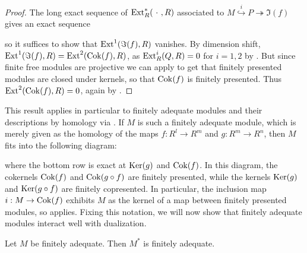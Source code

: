 \begin{proof}
  The long exact sequence of $\mathrm{Ext}^\ast_R(\ \cdot\ , R)$ associated to $M \overset{i}{\hookrightarrow} P \twoheadrightarrow \Im(f)$ gives an exact sequence
  \begin{center}
  \end{center}
  so it suffices to show that $\mathrm{Ext}^1(\Im (f), R)$ vanishes.
  By dimension shift, $\mathrm{Ext}^1(\Im (f), R) = \mathrm{Ext}^2(\operatorname{Cok} (f), R)$,
  as $\mathrm{Ext}^i_R(Q,R) = 0$ for $i = 1, 2$ by .
  But since finite free modules are projective we can apply  to get that finitely presented modules are closed under kernels, so that $\operatorname{Cok}(f)$ is finitely presented.
  Thus $\mathrm{Ext}^2(\operatorname{Cok} (f), R) = 0$, again by .
\end{proof}

This result applies in particular to finitely adequate modules and their descriptions by homology via .
If $M$ is such a finitely adequate module, which is merely given as the homology of the maps $f : R^l \to R^m$ and $g : R^m \to R^n$, then $M$ fits into the following diagram:
\begin{center}
\end{center}
where the bottom row is exact at $\operatorname{Ker} (g)$ and $\operatorname{Cok} (f)$.
In this diagram, the cokernels $\operatorname{Cok}(f)$ and $\operatorname{Cok}(g \circ f)$ are finitely presented, while the kernels $\operatorname{Ker}(g)$ and $\operatorname{Ker}(g \circ f)$ are finitely copresented.
In particular, the inclusion map $i : M \to \operatorname{Cok} (f)$ exhibits $M$ as the kernel of a map between finitely presented modules, so  applies.
Fixing this notation, we will now show that finitely adequate modules interact well with dualization.

\begin{proposition}\label{prp:dual-fin-ad}
  Let $M$ be finitely adequate. Then $M^\ast$ is finitely adequate.
\end{proposition}

